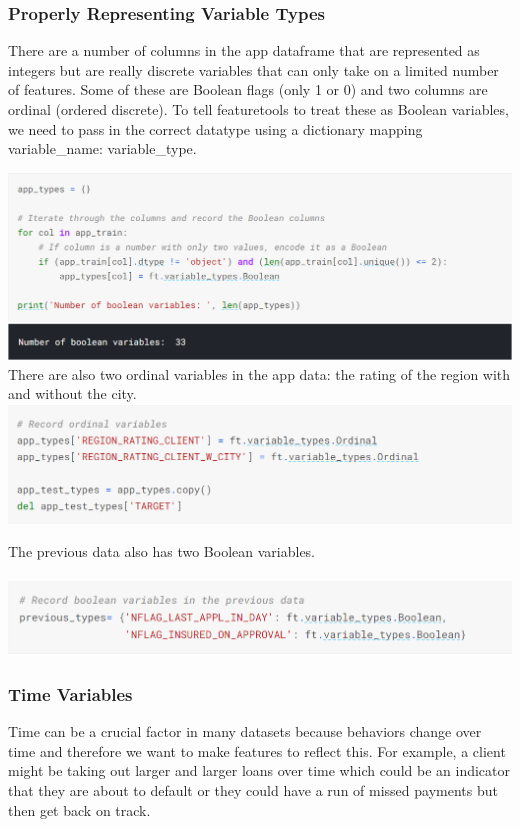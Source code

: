 \documentclass[twoside,a4paper]{article}
\begin{document}
\subsubsection{Properly Representing Variable Types}
There are a number of columns in the app dataframe that are represented as integers but are really discrete variables that can only take on a limited number of features. Some of these are Boolean flags (only 1 or 0) and two columns are ordinal (ordered discrete). To tell featuretools to treat these as Boolean variables, we need to pass in the correct datatype using a dictionary mapping {variable\_name: variable\_type}.

\includegraphics[scale=.8]{load3.png}
There are also two ordinal variables in the app data: the rating of the region with and without the city.
\clearpage %
\includegraphics[scale=.8]{load4.png}

The previous data also has two Boolean variables.\\\\

\includegraphics[scale=.8]{load 5.png}


\subsubsection{Time Variables}
Time can be a crucial factor in many datasets because behaviors change over time and therefore we want to make features to reflect this. For example, a client might be taking out larger and larger loans over time which could be an indicator that they are about to default or they could have a run of missed payments but then get back on track.
\end{document}

